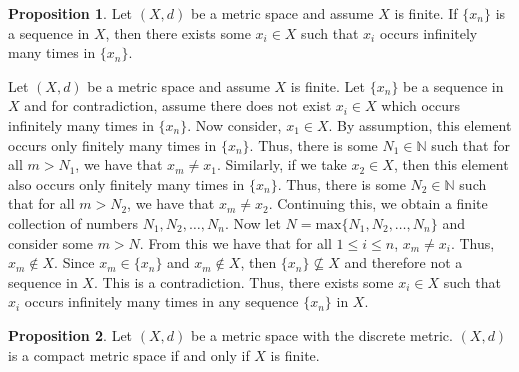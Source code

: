 \documentclass{article}
\makeatletter
\theoremstyle{definition}
\newtheorem{prop}{Proposition}[section]
\theoremstyle{remark}
\let\oldproofname=\proofname
\renewcommand{\proofname}{\bf{\textit{\oldproofname}}}
\theoremstyle{definition}
\renewenvironment{proof}[1][\proofname]{\par
  \pushQED{\qed}%
  \normalfont \topsep6\p@\@plus6\p@\relax
  \list{}{\leftmargin=0mm
          \rightmargin=0mm
          \settowidth{\itemindent}{\itshape#1}%
          \labelwidth=\itemindent
          \parsep=0pt \listparindent=0mm%
  }
  \item[\hskip\labelsep
        \itshape
    #1\@addpunct{.}]\ignorespaces
}{%
  \popQED\endlist\@endpefalse
}
\makeatother
\begin{document}
\begin{prop}\label{prop:2.5}
    Let $(X,d)$ be a metric space and assume $X$ is finite. If $\{x_n\}$ is a sequence in $X$, then there exists some $x_i\in X$ such that $x_i$ occurs infinitely many times in $\{x_n\}$.
\end{prop}

\begin{proof}
    Let $(X,d)$ be a metric space and assume $X$ is finite. Let $\{x_n\}$ be a sequence in $X$ and for contradiction, assume there does not exist $x_i\in X$ which occurs infinitely many times in $\{x_n\}$. Now consider, $x_1\in X$. By assumption, this element occurs only finitely many times in $\{x_n\}$. Thus, there is some $N_1\in\mathbb{N}$ such that for all $m>N_1$, we have that $x_m\neq x_1$. Similarly, if we take $x_2\in X$, then this element also occurs only finitely many times in $\{x_n\}$. Thus, there is some $N_2\in\mathbb{N}$ such that for all $m>N_2$, we have that $x_m\neq x_2$. Continuing this, we obtain a finite collection of numbers $N_1,N_2,\dots,N_n$. Now let $N=\text{max}\{N_1,N_2,\dots,N_n\}$ and consider some $m>N$. From this we have that for all $1\leq i\leq n$, $x_m\neq x_i$. Thus, $x_m\notin X$. Since $x_m\in\{x_n\}$ and $x_m\notin X$, then $\{x_n\}\not\subseteq X$ and therefore not a sequence in $X$. This is a contradiction. Thus, there exists some $x_i\in X$ such that $x_i$ occurs infinitely many times in any sequence $\{x_n\}$ in $X$.
\end{proof}

\newpage

\begin{prop}\label{prop:2.6}
    Let $(X,d)$ be a metric space with the discrete metric. $(X,d)$ is a compact metric space if and only if $X$ is finite. 
\end{prop}
\end{document}
